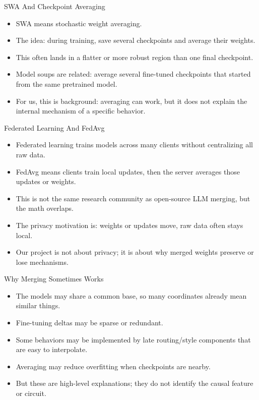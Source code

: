 \documentclass[aspectratio=169]{beamer}
\begin{document}
\begin{frame}{SWA And Checkpoint Averaging}
\small
\begin{itemize}
  \item SWA means stochastic weight averaging.
  \item The idea: during training, save several checkpoints and average their weights.
  \item This often lands in a flatter or more robust region than one final checkpoint.
  \item Model soups are related: average several fine-tuned checkpoints that started from the same pretrained model.
  \item For us, this is background: averaging can work, but it does not explain the internal mechanism of a specific behavior.
\end{itemize}
\end{frame}

\begin{frame}{Federated Learning And FedAvg}
\small
\begin{itemize}
  \item Federated learning trains models across many clients without centralizing all raw data.
  \item FedAvg means clients train local updates, then the server averages those updates or weights.
  \item This is not the same research community as open-source LLM merging, but the math overlaps.
  \item The privacy motivation is: weights or updates move, raw data often stays local.
  \item Our project is not about privacy; it is about why merged weights preserve or lose mechanisms.
\end{itemize}
\end{frame}

\begin{frame}{Why Merging Sometimes Works}
\small
\begin{itemize}
  \item The models may share a common base, so many coordinates already mean similar things.
  \item Fine-tuning deltas may be sparse or redundant.
  \item Some behaviors may be implemented by late routing/style components that are easy to interpolate.
  \item Averaging may reduce overfitting when checkpoints are nearby.
  \item But these are high-level explanations; they do not identify the causal feature or circuit.
\end{itemize}
\end{frame}
\end{document}
